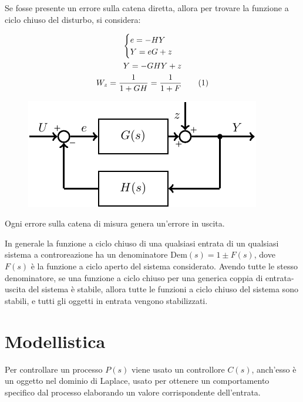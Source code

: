 \documentclass{article}
\numberwithin{equation}{subsection}
\newcommand{\tageq}{\tag{\stepcounter{equation}\theequation}}
\begin{document}
Se fosse presente un errore sulla catena diretta, allora per trovare la funzione a ciclo chiuso del disturbo, si considera:

\begin{gather*}
    \begin{cases}
        e=-HY\\
        Y=eG+z
    \end{cases}\\
    Y=-GHY+z\\
    W_z=\displaystyle\frac{1}{1+GH}=\frac{1}{1+F}\tageq
\end{gather*}

\begin{figure}[H]%
    \centering
    \includegraphics{errore-1.pdf}%
\end{figure}

Ogni errore sulla catena di misura genera un'errore in uscita.



In generale la funzione a ciclo chiuso di una qualsiasi entrata di un qualsiasi sistema a controreazione ha un denominatore $\mathrm{Dem}(s)=1\pm F(s)$, dove $F(s)$ è la funzione a 
ciclo aperto del sistema considerato. Avendo tutte le stesso denominatore, 
se una funzione a ciclo chiuso per una generica coppia di entrata-uscita del sistema è stabile, allora tutte le funzioni a ciclo chiuso del sistema sono 
stabili, e tutti gli oggetti in entrata vengono stabilizzati.  

\clearpage

\section{Modellistica}

Per controllare un processo $P(s)$ viene usato un controllore $C(s)$, anch'esso è un oggetto nel dominio di Laplace, usato per ottenere un comportamento specifico dal processo 
elaborando un valore corrispondente dell'entrata. 
\end{document}
